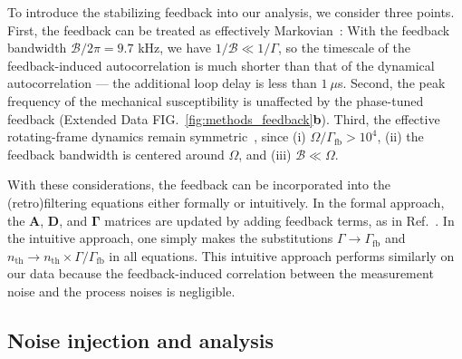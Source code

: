 \documentclass[./Main-revtex.tex]{subfiles}
\begin{document}
To introduce the stabilizing feedback into our analysis, we consider three points. First, the feedback can be treated as effectively Markovian~\cite{wiseman2009quantum}: With the feedback bandwidth $\mathcal{B}/2\pi=9.7$ kHz, we have $1/\mathcal{B}\ll 1/\Gamma$, so the timescale of the feedback-induced autocorrelation is much shorter than that of the dynamical autocorrelation --- the additional loop delay is less than $1~\mu$s. Second, the peak frequency of the mechanical susceptibility is unaffected by the phase-tuned feedback (Extended Data FIG.~\ref{fig:methods_feedback}\textbf{b}). Third, the effective rotating-frame dynamics remain symmetric~\cite{doherty2012quantum}, since (i) $\Omega/\Gamma_\text{fb} > 10^4$, (ii) the feedback bandwidth is centered around $\Omega$, and (iii) $\mathcal{B}\ll \Omega$.

With these considerations, the feedback can be incorporated into the (retro)filtering equations either formally or intuitively. In the formal approach, the $\mathbf{A}$, $\mathbf{D}$, and $\bm{\Gamma}$ matrices are updated by adding feedback terms, as in Ref.~\cite{wiseman2009quantum}. In the intuitive approach, one simply makes the substitutions $\Gamma\rightarrow\Gamma_\text{fb}$ and $n_\text{th}\rightarrow n_\text{th}\times\Gamma/\Gamma_\text{fb}$ in all equations. This intuitive approach performs similarly on our data because the feedback-induced correlation between the measurement noise and the process noises is negligible.

\subsection{Noise injection and analysis}\label{sec:NI_analysis}
\end{document}
